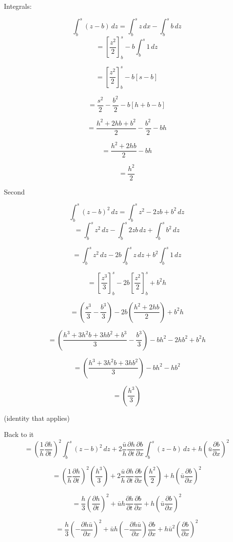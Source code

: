 \documentclass[12pt]{article}
\begin{document}
Integrals:

\[\int_b^s \left(z - b\right)  \, dz = \int_b^s z\, dx - \int_b^s b \, dz\]
\[= \left[\frac{z^2}{2}\right]_{b}^{s} - b\int_b^s 1 \, dz\]

\[= \left[\frac{z^2}{2}\right]_{b}^{s} - b\left[s - b\right]\]

\[= \frac{s^2}{2} - \frac{b^2}{2} - b\left[h + b - b\right]\]

\[= \frac{h^2 + 2hb + b^2}{2} - \frac{b^2}{2} - bh\]

\[= \frac{h^2 + 2hb}{2} - bh\]

\[= \frac{h^2}{2}\]

Second

\[\int_b^s \left(z - b\right)^2  \, dz = \int_b^s z^2 - 2zb + b^2  \, dz\]
\[= \int_b^s z^2 \, dz - \int_b^s2zb \, dz+ \int_b^s b^2  \, dz\]

\[= \int_b^s z^2 \, dz - 2b\int_b^s z \, dz+ b^2\int_b^s 1  \, dz\]

\[= \left[\frac{z^3}{3}\right]_{b}^{s} - 2b\left[\frac{z^2}{2}\right]_{b}^{s}+ b^2h\]

\[= \left(\frac{s^3}{3} - \frac{b^3}{3}\right) - 2b\left(\frac{h^2 + 2hb}{2}\right)+ b^2h\]

\[= \left(\frac{h^3 + 3 h^2 b + 3 h b^2 + b^3}{3} - \frac{b^3}{3}\right) - bh^2 -  2hb^2+ b^2h\]

\[= \left(\frac{h^3 + 3 h^2 b + 3 h b^2}{3}\right) - bh^2 -  hb^2\]

\[= \left(\frac{h^3}{3}\right)\]

(identity that applies)

Back to it
\[ = \left( \frac{1}{h}\frac{\partial h}{\partial t}\right)^2 \int_b^s  \left(z- b\right)^2  \, dz  +  2\frac{\bar{u}}{h}\frac{\partial h}{\partial t}\frac{\partial b}{\partial x}\int_b^s \left(z - b\right)  \, dz  + h\left( \bar{u} \frac{\partial b}{\partial x} \right)^2 \]

\[ = \left( \frac{1}{h}\frac{\partial h}{\partial t}\right)^2 \left(\frac{h^3}{3}\right) +  2\frac{\bar{u}}{h}\frac{\partial h}{\partial t}\frac{\partial b}{\partial x}\left(\frac{h^2}{2}\right)  + h\left( \bar{u} \frac{\partial b}{\partial x} \right)^2 \]

\[ = \frac{h}{3}\left(\frac{\partial h}{\partial t}\right)^2  + \bar{u}h  \frac{\partial h}{\partial t}\frac{\partial b}{\partial x}  + h\left( \bar{u} \frac{\partial b}{\partial x} \right)^2 \]

\[ = \frac{h}{3}\left( - \frac{\partial h\bar{u}}{\partial x}\right)^2  + \bar{u}h  \left(- \frac{\partial h\bar{u}}{\partial x}\right)\frac{\partial b}{\partial x}  + h\bar{u} ^2\left( \frac{\partial b}{\partial x} \right)^2 \]
\end{document}
